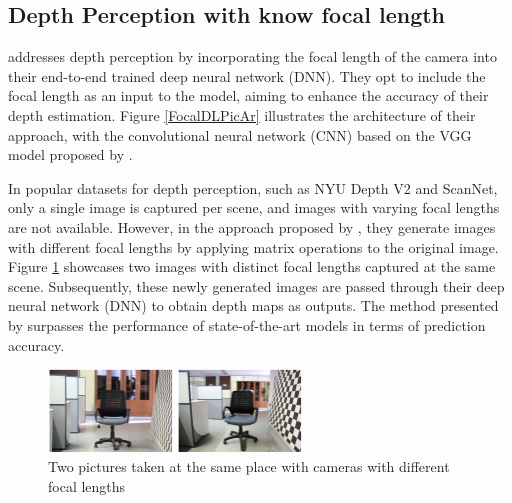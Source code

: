 \documentclass{article} %
\begin{document}
\subsection{Depth Perception with know focal length}


\cite{FocalDL} addresses depth perception by incorporating the focal length of the camera into their end-to-end trained deep neural network (DNN). They opt to include the focal length as an input to the model, aiming to enhance the accuracy of their depth estimation. Figure \ref{FocalDLPicAr} illustrates the architecture of their approach, with the convolutional neural network (CNN) based on the VGG model proposed by \cite{VGG}.





In popular datasets for depth perception, such as NYU Depth V2 and ScanNet, only a single image is captured per scene, and images with varying focal lengths are not available. However, in the approach proposed by \cite{FocalDL}, they generate images with different focal lengths by applying matrix operations to the original image. Figure \ref{FocalDLPicCMP} showcases two images with distinct focal lengths captured at the same scene. Subsequently, these newly generated images are passed through their deep neural network (DNN) to obtain depth maps as outputs. The method presented by \cite{FocalDL} surpasses the performance of state-of-the-art models in terms of prediction accuracy.

\begin{figure}[h]
\begin{center}
\includegraphics[width=0.6\textwidth]{Figs/FocalDLPicCMP.png}
\end{center}
\caption{Two pictures taken at the same place with cameras with different focal lengths}
\label{FocalDLPicCMP}
\end{figure}
\end{document}
